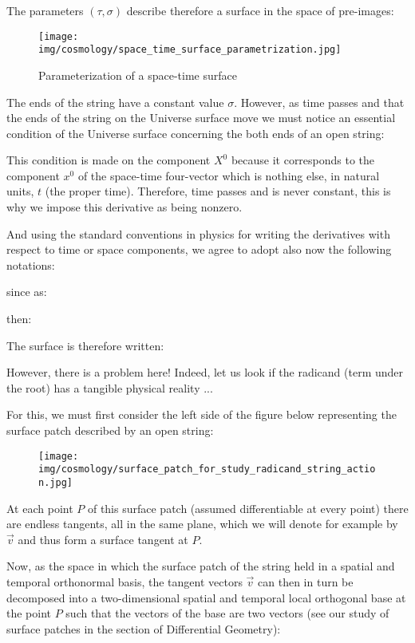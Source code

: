 	The parameters $(\tau,\sigma)$ describe therefore a surface in the space of pre-images:
	\begin{figure}[H]
		\begin{center}
		\texttt{[image: img/cosmology/space\_time\_surface\_parametrization.jpg]}
		\end{center}	
		\caption{Parameterization of a space-time surface}
	\end{figure}
	The ends of the string have a constant value $\sigma$. However, as time passes and that the ends of the string on the Universe surface move we must notice an essential condition of the Universe surface concerning the both ends of an open string:
	
	\begin{tcolorbox}[title=Remark,colframe=black,arc=10pt]
	This condition is made on the component $X^0$ because it corresponds to the component $x^0$ of the space-time four-vector which is nothing else, in natural units, $t$ (the proper time). Therefore, time passes and is never constant, this is why we  impose this derivative as being nonzero.
	\end{tcolorbox}
	And using the standard conventions in physics for writing the derivatives with respect to time or space components, we agree to adopt also now the following notations:
	
	since as:
	
	then:
	
	The surface is therefore written:
	
	However, there is a problem here! Indeed, let us look if the radicand (term under the root) has a tangible physical reality ...

	For this, we must first consider the left side of the figure below representing the surface patch described by an open string:
	\begin{figure}[H]
		\begin{center}
		\texttt{[image: img/cosmology/surface\_patch\_for\_study\_radicand\_string\_action.jpg]}
		\end{center}	
	\end{figure}
	At each point $P$ of this surface patch (assumed differentiable at every point) there are endless tangents, all in the same plane, which we will denote for example by $\vec{v}$ and thus form a surface tangent at $P$.

	Now, as the space in which the surface patch of the string held in a spatial and temporal orthonormal basis, the tangent vectors $\vec{v}$ can then in turn be decomposed into a two-dimensional spatial and temporal local orthogonal base at the point $P$ such that the vectors of the base are two vectors (see our study of surface patches in the section of Differential Geometry):
	
